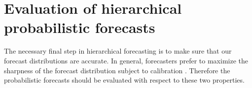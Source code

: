 \documentclass[12pt]{article}
\theoremstyle{definition}
\begin{document}

%
%
%

\section{Evaluation of hierarchical probabilistic forecasts}\label{sec:evaluation}

The necessary final step in hierarchical forecasting is to make sure that our forecast distributions are accurate. In general, forecasters prefer to maximize the sharpness of the forecast distribution subject to calibration \citep{Gneiting2014}. Therefore the probabilistic forecasts should be evaluated with respect to these two properties.
\end{document}
